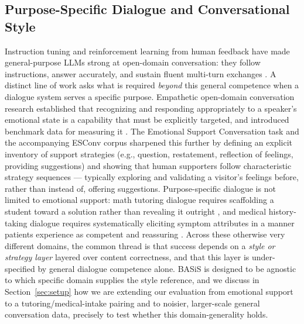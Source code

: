 \documentclass[manuscript,review,anonymous]{acmart}
\begin{document}
\subsection{Purpose-Specific Dialogue and Conversational Style}
Instruction tuning and reinforcement learning from human feedback have made general-purpose LLMs strong at open-domain conversation: they follow instructions, answer accurately, and sustain fluent multi-turn exchanges \cite{ouyang2022instructgpt}. A distinct line of work asks what is required \emph{beyond} this general competence when a dialogue system serves a specific purpose. Empathetic open-domain conversation research established that recognizing and responding appropriately to a speaker's emotional state is a capability that must be explicitly targeted, and introduced benchmark data for measuring it \cite{rashkin2019empathetic}. The Emotional Support Conversation task and the accompanying ESConv corpus \cite{liu2021esconv} sharpened this further by defining an explicit inventory of support strategies (e.g., question, restatement, reflection of feelings, providing suggestions) and showing that human supporters follow characteristic strategy sequences --- typically exploring and validating a visitor's feelings before, rather than instead of, offering suggestions. Purpose-specific dialogue is not limited to emotional support: math tutoring dialogue requires scaffolding a student toward a solution rather than revealing it outright \cite{macina2023mathdial}, and medical history-taking dialogue requires systematically eliciting symptom attributes in a manner patients experience as competent and reassuring \cite{saley2024meditod}. Across these otherwise very different domains, the common thread is that success depends on a \emph{style or strategy layer} layered over content correctness, and that this layer is under-specified by general dialogue competence alone. BASiS is designed to be agnostic to which specific domain supplies the style reference, and we discuss in Section~\ref{sec:setup} how we are extending our evaluation from emotional support to a tutoring/medical-intake pairing and to noisier, larger-scale general conversation data, precisely to test whether this domain-generality holds.
\end{document}

